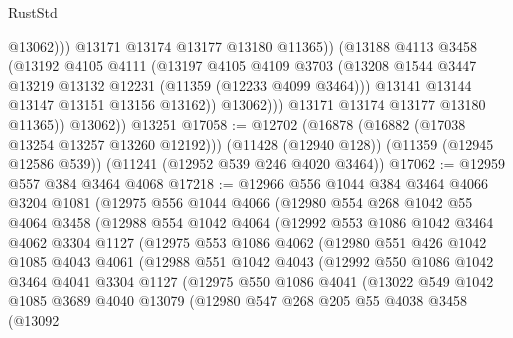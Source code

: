 \begin{lexlean}{RustStd}
\begin{coremodule}
{{{{{{{{{{{{{{{{{{{                          @13062)))
                    @13171
                    @13174
                    @13177
                    @13180
                    @11365))
                (@13188
                  @4113
                  @3458
                  (@13192
                    @4105
                    @4111
                    (@13197
                      @4105
                      @4109
                      @3703
                      (@13208 @1544 @3447 @13219 @13132 @12231 (@11359 (@12233 @4099 @3464)))
                      @13141
                      @13144
                      @13147
                      @13151
                      @13156
                      @13162))
                  @13062)))
            @13171
            @13174
            @13177
            @13180
            @11365))
        @13062))
    @13251
@17058 := @12702
    (@16878 (@16882 (@17038 @13254 @13257 @13260 @12192)))
    (@11428 (@12940 @128))
    (@11359 (@12945 @12586 @539))
    (@11241 (@12952 @539 @246 @4020 @3464))
@17062 := @12959 @557 @384 @3464 @4068
@17218 := @12966
    @556
    @1044
    @384
    @3464
    @4066
    @3204
    @1081
    (@12975
      @556
      @1044
      @4066
      (@12980
        @554
        @268
        @1042
        @55
        @4064
        @3458
        (@12988
          @554
          @1042
          @4064
          (@12992
            @553
            @1086
            @1042
            @3464
            @4062
            @3304
            @1127
            (@12975
              @553
              @1086
              @4062
              (@12980
                @551
                @426
                @1042
                @1085
                @4043
                @4061
                (@12988
                  @551
                  @1042
                  @4043
                  (@12992
                    @550
                    @1086
                    @1042
                    @3464
                    @4041
                    @3304
                    @1127
                    (@12975
                      @550
                      @1086
                      @4041
                      (@13022
                        @549
                        @1042
                        @1085
                        @3689
                        @4040
                        @13079
                        (@12980
                          @547
                          @268
                          @205
                          @55
                          @4038
                          @3458
                          (@13092
}}}}}}}}}}}}}}}}}}}
\end{coremodule}
\end{lexlean}
